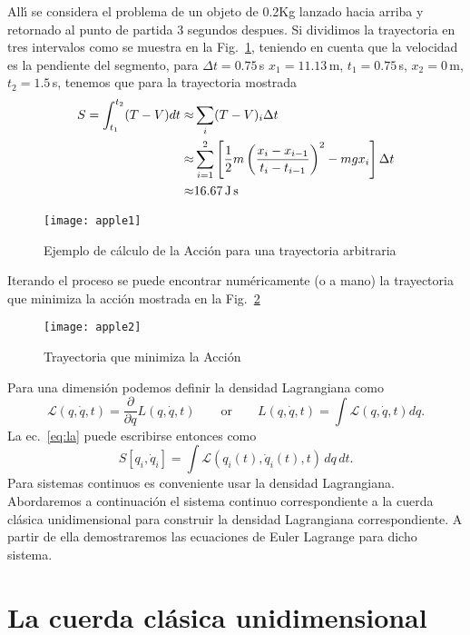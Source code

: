 All\'\i{} se considera el problema de un objeto de 0.2Kg lanzado hacia arriba y retornado al punto de partida 3 segundos despues. Si dividimos la trayectoria en tres intervalos como se muestra en la Fig.~\ref{fig:apple1}, teniendo en cuenta que la velocidad es la pendiente del segmento, para $\Delta t=0.75\,$s $x_1=11.13\,$m, $t_1=0.75\,$s, $x_2=0\,$m, $t_2=1.5\,$s, tenemos que para la trayectoria mostrada
\begin{align}
  S=\int_{t_1}^{t_2}(T-V)dt\approx&\sum_i(T-V)_i\Delta t\nonumber\\
  \approx&\sum_{i=1}^2\left[\frac{1}{2}m\left(\frac{x_i-x_{i-1}}{t_i-t_{i-1}}\right)^2-m g x_i\right]\Delta t\nonumber\\
  \approx&16.67\,\text{J\,s}
\end{align}
\begin{figure}
  \centering
  \texttt{[image: apple1]}
  \caption{Ejemplo de c\'alculo de la Acci\'on para una trayectoria arbitraria}
  \label{fig:apple1}
\end{figure}
Iterando el proceso se puede encontrar num\'ericamente (o a mano) la trayectoria que minimiza la acci\'on mostrada en la Fig.~\ref{fig:apple2}
\begin{figure}
  \centering
\texttt{[image: apple2]}
  \caption{Trayectoria que minimiza la Acci\'on}
\label{fig:apple2}
\end{figure}
Para una dimensi\'on podemos definir la densidad Lagrangiana como
\begin{equation}
  \mathcal{L}(q,\dot q,t)=\frac{\partial}{\partial q}L(q,\dot q,t)\qquad\text{or}\qquad L(q,\dot q,t)=\int\mathcal{L}(q,\dot q,t)dq.
\end{equation}
La ec.~\eqref{eq:la} puede escribirse entonces como
\begin{equation}
   S\left[q_i,\dot{q}_i\right] = \int \mathcal{L}(q_i(t), \dot{q}_i(t),t)\, dq\,dt.
\end{equation}
Para sistemas continuos es conveniente usar la densidad Lagrangiana. Abordaremos a continuaci\'on el sistema continuo correspondiente a la cuerda cl\'asica unidimensional para construir la densidad Lagrangiana correspondiente. A partir de ella demostraremos las ecuaciones de Euler Lagrange para dicho sistema.


\section{La cuerda cl\'asica unidimensional}
\label{sec:la-cuerda-clasica}

